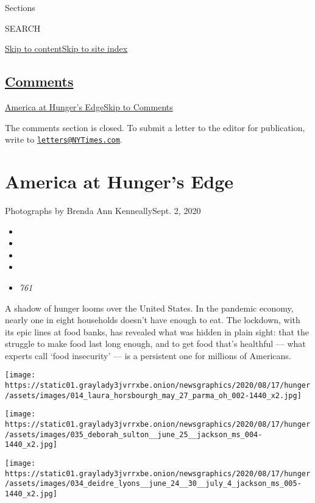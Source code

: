 Sections

SEARCH

\protect\hyperlink{site-content}{Skip to
content}\protect\hyperlink{site-index}{Skip to site index}

\hypertarget{comments}{%
\subsection{\texorpdfstring{\protect\hyperlink{commentsContainer}{Comments}}{Comments}}\label{comments}}

\href{}{America at Hunger's Edge}\href{}{Skip to Comments}

The comments section is closed. To submit a letter to the editor for
publication, write to
\href{mailto:letters@NYTimes.com}{\nolinkurl{letters@NYTimes.com}}.

\hypertarget{america-at-hungers-edge}{%
\section{America at Hunger's Edge}\label{america-at-hungers-edge}}

Photographs by Brenda Ann KenneallySept. 2, 2020

\begin{itemize}
\item
\item
\item
\item
\item
  \emph{761}
\end{itemize}

A shadow of hunger looms over the United States. In the pandemic
economy, nearly one in eight households doesn't have enough to eat. The
lockdown, with its epic lines at food banks, has revealed what was
hidden in plain sight: that the struggle to make food last long enough,
and to get food that's healthful --- what experts call `food insecurity'
--- is a persistent one for millions of Americans.

\texttt{[image: https://static01.graylady3jvrrxbe.onion/newsgraphics/2020/08/17/hunger/assets/images/014\_laura\_horsbourgh\_may\_27\_parma\_oh\_002-1440\_x2.jpg]}

\texttt{[image: https://static01.graylady3jvrrxbe.onion/newsgraphics/2020/08/17/hunger/assets/images/035\_deborah\_sulton\_\_june\_25\_\_jackson\_ms\_004-1440\_x2.jpg]}

\texttt{[image: https://static01.graylady3jvrrxbe.onion/newsgraphics/2020/08/17/hunger/assets/images/034\_deidre\_lyons\_\_june\_24\_\_30\_\_july\_4\_jackson\_ms\_005-1440\_x2.jpg]}

